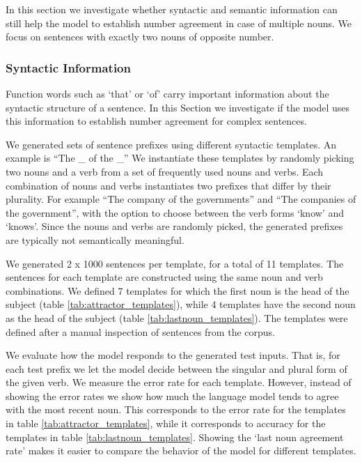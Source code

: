In this section we investigate whether
syntactic and semantic information
can still help the model 
to establish number agreement
in case of multiple nouns.
We focus on sentences with exactly two nouns
of opposite number.


\subsubsection{Syntactic Information}

Function words such as `that' or `of' carry 
important information about the syntactic structure of a sentence.
In this Section we investigate if the model
uses this information to establish number agreement
for complex sentences.

We generated sets of sentence prefixes using 
different syntactic templates.
An example is ``The \_ of the \_''
We instantiate these templates by randomly
picking two nouns and a verb 
from a set of frequently used nouns and verbs. 
Each combination of nouns and verbs instantiates
two prefixes that differ by their plurality.
For example ``The company of the governments''
and ``The companies of the government'',
with the option to choose between the verb forms
`know' and `knows'.
Since the nouns and verbs are randomly picked,
the generated prefixes 
are typically not semantically
meaningful.

We generated 2 x 1000 sentences per template,
for a total of 11 templates.
The sentences for each template are constructed using the same
noun and verb combinations.
We defined 7 templates for which the first noun is 
the head of the subject (table \ref{tab:attractor_templates}),
while 4 templates have the second noun as the head of the subject
(table \ref{tab:lastnoun_templates}).
The templates were defined after a manual inspection
of sentences from the corpus.

We evaluate how the model responds to the generated test inputs.
That is, for each test prefix we let the model decide between 
the singular and plural form of the given verb. 
We measure the error rate for each template.
However, instead of showing the error rates we
show how much the language model tends to agree with the most recent noun.
This corresponds to the error rate for the templates in table \ref{tab:attractor_templates},
while it corresponds to accuracy for the templates in table \ref{tab:lastnoun_templates}.
Showing the `last noun agreement rate' makes it easier
to compare the behavior of the model for different templates.

